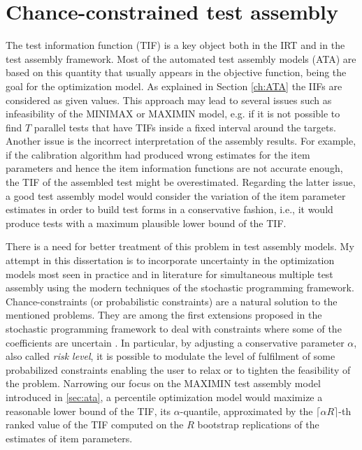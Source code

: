 \chapter{Chance-constrained test assembly}
\label{sec:CC}

The test information function (TIF) is a key object both in the IRT and in the test assembly framework.
Most of the automated test assembly models (ATA) are based on this quantity that usually appears in the objective function, being the goal for the optimization model.
As explained in Section \ref{ch:ATA} the IIFs are considered as given values.
This approach may lead to several issues such as infeasibility of the MINIMAX or MAXIMIN model, e.g. if it is not possible to find $T$ parallel tests that have TIFs inside a fixed interval around the targets.
Another issue is the incorrect interpretation of the assembly results.
For example, if the calibration algorithm had produced wrong estimates for the item parameters and hence the item information functions are not accurate enough, the TIF of the assembled test might be overestimated.
Regarding the latter issue, a good test assembly model would consider the variation of the item parameter estimates in order to build test forms in a conservative fashion, i.e., it would produce tests with a maximum plausible lower bound of the TIF.  

There is a need for better treatment of this problem in test assembly models.
My attempt in this dissertation is to incorporate uncertainty in the optimization models most seen in practice and in literature for simultaneous multiple test assembly using the modern techniques of the stochastic programming framework.
Chance-constraints (or probabilistic constraints) are a natural solution to the mentioned problems.
They are among the first extensions proposed in the stochastic programming framework to deal with constraints where some of the coefficients are uncertain \parencite{charnes1963deterministic,krokhmal2002portfolio}.
In particular, by adjusting a conservative parameter $\alpha$, also called \emph{risk level}, it is possible to modulate the level of fulfilment of some probabilized constraints enabling the user to relax or to tighten the feasibility of the problem.
Narrowing our focus on the MAXIMIN test assembly model introduced in \ref{sec:ata}, a percentile optimization model would maximize a reasonable lower bound of the TIF, its $\alpha$-quantile, approximated by the $\lceil \alpha R \rceil$-th ranked value of the TIF computed on the $R$ bootstrap replications of the estimates of item parameters.

